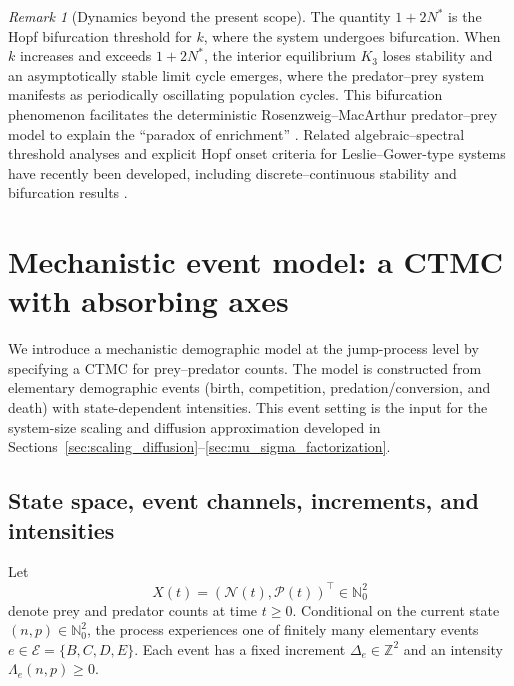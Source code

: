 \documentclass[pdflatex,sn-mathphys-ay]{sn-jnl}
\theoremstyle{thmstyleone}
\theoremstyle{definition}
\theoremstyle{remark}
\newtheorem{remark}[theorem]{Remark}
\begin{document}
\begin{remark}[Dynamics beyond the present scope]\label{rmk:hopf_bifurcation_dynamics}
The quantity $1+2N^\ast$ is the Hopf bifurcation threshold for $k$, where the system undergoes bifurcation. When $k$ increases and exceeds $1+2N^*$, the interior equilibrium $K_3$ loses stability and an asymptotically stable limit cycle emerges, where the predator--prey system manifests as periodically oscillating population cycles. This bifurcation phenomenon facilitates the deterministic Rosenzweig–MacArthur predator–prey model to explain the ``paradox of enrichment'' \citep{gounand_paradox_2014}. Related algebraic–spectral threshold analyses and explicit Hopf onset criteria for Leslie–Gower-type systems have recently been developed, including discrete–continuous stability and bifurcation results \citep{wang_algebraicspectral_2026}.  
\end{remark}

\section{Mechanistic event model: a CTMC with absorbing axes}
\label{sec:mech_ctmc}

We introduce a mechanistic demographic model at the jump-process level by specifying a CTMC for prey--predator counts. The model is constructed from elementary demographic events (birth,
competition, predation/conversion, and death) with state-dependent intensities. This event setting is the input
for the system-size scaling and diffusion approximation developed in
Sections~\ref{sec:scaling_diffusion}--\ref{sec:mu_sigma_factorization}.

\subsection{State space, event channels, increments, and intensities}
\label{subsec:ctmc_specification_A}

Let
\[
X(t)=(\mathcal N(t),\mathcal P(t))^\top\in\mathbb{N}_0^2
\]
denote prey and predator counts at time $t\ge 0$. Conditional on the current state $(n,p)\in\mathbb{N}_0^2$, the
process experiences one of finitely many elementary events $e\in\mathcal E=\{B,C,D,E\}$. Each event has a fixed
increment $\Delta_e\in\mathbb{Z}^2$ and an intensity $\Lambda_e(n,p)\ge 0$.
\end{document}
